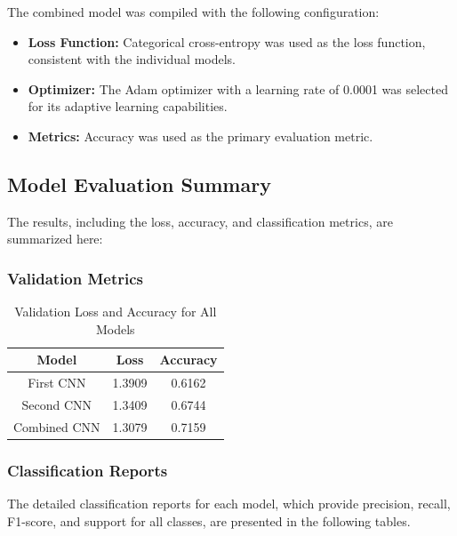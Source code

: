 \documentclass{article}
\begin{document}
The combined model was compiled with the following configuration:
\begin{itemize}
    \item \textbf{Loss Function:} Categorical cross-entropy was used as the loss function, consistent with the individual models.
    \item \textbf{Optimizer:} The Adam optimizer with a learning rate of 0.0001 was selected for its adaptive learning capabilities.
    \item \textbf{Metrics:} Accuracy was used as the primary evaluation metric.
\end{itemize}

\subsection{Model Evaluation Summary}

The results, including the loss, accuracy, and classification metrics, are summarized here:

\subsubsection{Validation Metrics}

\begin{table}[h!]
    \centering
    \begin{tabular}{|c|c|c|}
        \hline
        \textbf{Model} & \textbf{Loss} & \textbf{Accuracy} \\
        \hline
        First CNN & 1.3909 & 0.6162 \\
        Second CNN & 1.3409 & 0.6744 \\
        Combined CNN & 1.3079 & 0.7159 \\
        \hline
    \end{tabular}
    \caption{Validation Loss and Accuracy for All Models}
    \label{tab:validation_metrics_summary}
\end{table}

\subsubsection{Classification Reports}

The detailed classification reports for each model, which provide precision, recall, F1-score, and support for all classes, are presented in the following tables.
\end{document}
